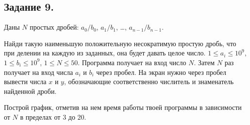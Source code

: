 
\subsection*{Задание 9.}
Даны $N$ простых дробей: $a_0/b_0$, $a_1/b_1$, \ldots, $a_{n-1}/b_{n-1}$.
    
Найди такую наименьшую положительную несократимую простую дробь, что при делении на каждую из заданных, она будет давать целое число.
$1 \leq a_i \leq 10^9$,
$1 \leq b_i \leq 10^9$,
$1 \leq N \leq 50$.
Программа получает на вход число $N$. Затем $N$ раз получает на вход числа $a_i$ и $b_i$ через пробел. На экран нужно через пробел вывести числа $x$ и $y$, обозначающие соответственно числитель и знаменатель найденной дроби.
        
Построй график, отметив на нем время работы твоей программы в зависимости от $N$ в пределах от $3$ до $20$. 


    
    
    

